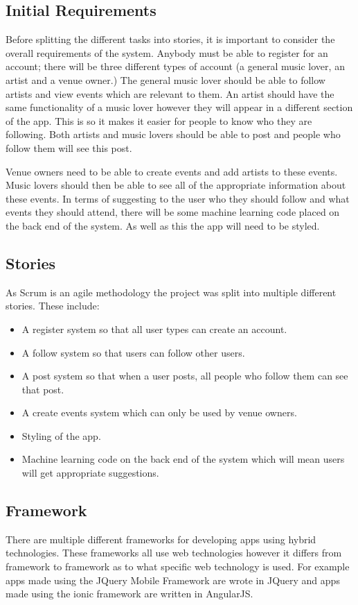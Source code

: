\subsection{Initial Requirements}
Before splitting the different tasks into stories, it is important to consider the overall requirements of the system. Anybody must be able to register for an account; there will be three different types of account (a general music lover, an artist and a venue owner.) The general music lover should be able to follow artists and view events which are relevant to them. An artist should have the same functionality of a music lover however they will appear in a different section of the app. This is so it makes it easier for people to know who they are following. Both artists and music lovers should be able to post and people who follow them will see this post.

Venue owners need to be able to create events and add artists to these events. Music lovers should then be able to see all of the appropriate information about these events. In terms of suggesting to the user who they should follow and what events they should attend, there will be some machine learning code placed on the back end of the system. As well as this the app will need to be styled.

\subsection{Stories}
As Scrum is an agile methodology the project was split into multiple different stories. These include:
\begin{itemize}
	\item A register system so that all user types can create an account.
	\item A follow system so that users can follow other users.
	\item A post system so that when a user posts, all people who follow them can see that post.
	\item A create events system which can only be used by venue owners.
	\item Styling of the app.
	\item Machine learning code on the back end of the system which will mean users will get appropriate suggestions.
\end{itemize}

\subsection{Framework}
There are multiple different frameworks for developing apps using hybrid technologies. These frameworks all use web technologies however it differs from framework to framework as to what specific web technology is used. For example apps made using the JQuery Mobile Framework are wrote in JQuery and apps made using the ionic framework are written in AngularJS.

